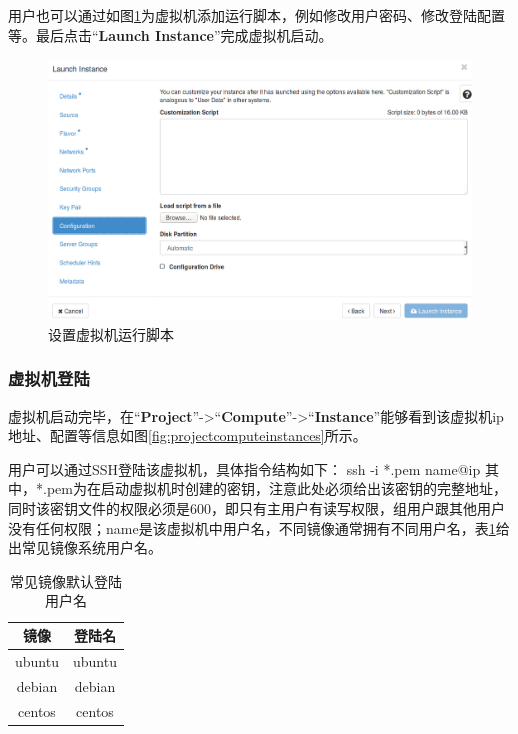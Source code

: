 \documentclass[12pt]{article}
\begin{document}
用户也可以通过如图\ref{fig:launchInstanceConfig}为虚拟机添加运行脚本，例如修改用户密码、修改登陆配置等。最后点击``\textbf{Launch Instance}''完成虚拟机启动。
\begin{figure}[!htb]
\centering
\includegraphics[width=6in]{./figures/LaunchInstanceConfig}
\caption{设置虚拟机运行脚本}
\label{fig:launchInstanceConfig}
\end{figure}

\subsubsection{虚拟机登陆}
虚拟机启动完毕，在``\textbf{Project}''->``\textbf{Compute}''->``\textbf{Instance}''能够看到该虚拟机ip地址、配置等信息如图\ref{fig:projectcomputeinstances}所示。

用户可以通过SSH登陆该虚拟机，具体指令结构如下：
ssh -i *.pem name@ip
其中，*.pem为在启动虚拟机时创建的密钥，注意此处必须给出该密钥的完整地址，同时该密钥文件的权限必须是600，即只有主用户有读写权限，组用户跟其他用户没有任何权限；name是该虚拟机中用户名，不同镜像通常拥有不同用户名，表\ref{tab:userName}给出常见镜像系统用户名。
\begin{table}[!htb]
\centering
\caption{常见镜像默认登陆用户名}
\label{tab:userName}
\begin{tabular}{|c|c|} \hline
 镜像 &登陆名\\ \hline
 ubuntu& ubuntu\\ \hline
 debian& debian\\ \hline
 centos& centos\\ \hline
\end{tabular}
\end{table}
\end{document}
